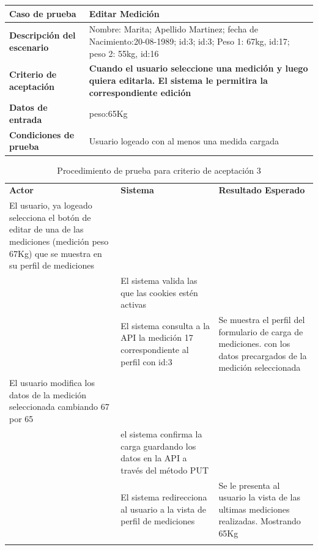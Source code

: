 \documentclass[a4paper,12pt]{article}
\begin{document}

{\scriptsize
	\begin{table}[h]
	\centering
	\begin{tabular}{||l|p{10cm}||}
    	\rowcolor[gray]{0.9}
	    \hline 
        \hline 
	    \textbf{Caso de prueba} & \textbf{Editar Medición}\\  \hline
	    \textbf{Descripción del escenario}&  Nombre: Marita; Apellido Martinez; fecha de Nacimiento:20-08-1989; id:3; id:3; Peso 1: 67kg, id:17; peso 2: 55kg, id:16\\ \hline
	    \textbf{Criterio de aceptación}& \textbf{Cuando el usuario seleccione una medición  y luego quiera editarla. El sistema le permitira la correspondiente edición}\\ \hline
        \textbf{Datos de entrada}& peso:65Kg \\ \hline
        \textbf{Condiciones de  prueba}& Usuario logeado con al menos una medida cargada \\ \hline \hline
	    \end{tabular}
	    \end{table}
	}
    

	\begin{longtable}{|p{5cm}|p{5cm}|p{4cm}|}
	    \hline \hline \rowcolor[gray]{0.9}
        \multicolumn{3}{||l|}{\textbf{Procedimiento de Prueba - Editar mediciones}} \\ \hline
	    \hline 
        \rowcolor[gray]{0.9}
	    \textbf{Actor} & \textbf{Sistema}& \textbf{Resultado Esperado} \\  \hline
	    El usuario, ya logeado selecciona el botón de editar de una de las mediciones (medición peso 67Kg) que se muestra en su perfil de mediciones& & \\ \hline
        & El sistema valida las que las cookies estén activas & \\ \hline
        & El sistema consulta a la API la medición 17 correspondiente al perfil con id:3 & Se muestra el perfil del formulario de carga de mediciones. con los datos precargados de la medición seleccionada\\ \hline        
	    El usuario modifica los datos de la medición seleccionada cambiando 67 por 65&  &\\ \hline
        & el sistema confirma la carga guardando los datos en la API a través del método PUT&\\ \hline
        &El sistema redirecciona al usuario a la vista de perfil de mediciones&  Se le presenta al usuario la vista de las ultimas mediciones realizadas. Mostrando 65Kg \\ \hline
        		\caption{Procedimiento de prueba para criterio de aceptación 3}
	    \end{longtable}
	
\end{document}
